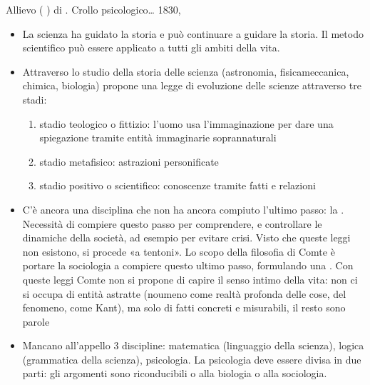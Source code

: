 \documentclass[letterpaper,10pt,italian]{jupyterBook}
\begin{document}
\sphinxAtStartPar
{} Allievo ( ) di {\hyperref[\detokenize{ch/history:pc-saint-simon}]{}}. Crollo psicologico…
 1830, 
\begin{itemize}
\item {} 
\sphinxAtStartPar
La scienza ha guidato la storia e può continuare a guidare la storia. Il metodo scientifico può essere applicato a tutti gli ambiti della vita.

\item {} 
\sphinxAtStartPar
{} Attraverso lo studio della storia delle scienza (astronomia, fisica\sphinxhyphen{}meccanica, chimica, biologia) propone una legge di evoluzione delle scienze attraverso tre stadi:
\begin{enumerate}
%
\item {} 
\sphinxAtStartPar
stadio teologico o fittizio: l’uomo usa l’immaginazione per dare una spiegazione tramite entità immaginarie soprannaturali

\item {} 
\sphinxAtStartPar
stadio metafisico: astrazioni personificate

\item {} 
\sphinxAtStartPar
stadio positivo o scientifico: conoscenze tramite fatti e relazioni

\end{enumerate}

\item {} 
\sphinxAtStartPar
C’è ancora una disciplina che non ha ancora compiuto l’ultimo passo: la . Necessità di compiere questo passo per comprendere,  e controllare le dinamiche della società, ad esempio per evitare crisi. Visto che queste leggi non esistono, si procede «a tentoni». Lo scopo della filosofia di Comte è portare la sociologia a compiere questo ultimo passo, formulando una . Con queste leggi Comte non si propone di capire il senso intimo della vita: non ci si occupa di entità astratte (noumeno come realtà profonda delle cose, del fenomeno, come Kant), ma solo di fatti concreti e misurabili, il resto sono parole

\item {} 
\sphinxAtStartPar
Mancano all’appello 3 discipline: matematica (linguaggio della scienza), logica (grammatica della scienza), psicologia. La psicologia deve essere divisa in due parti: gli argomenti sono riconducibili o alla biologia o alla sociologia.


\end{itemize}
\end{document}
